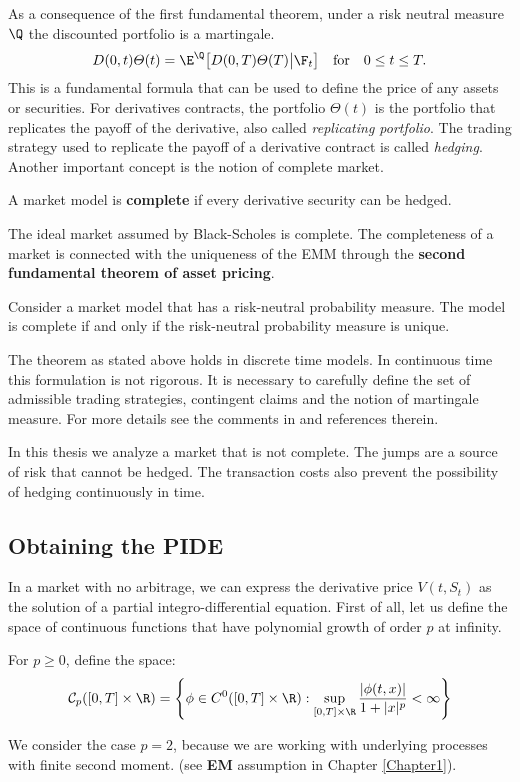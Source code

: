 As a consequence of the first fundamental theorem, under a risk neutral measure $\Q$ the discounted portfolio is a martingale.  
\begin{equation}\label{derivative_price}
 D(0,t) \varTheta(t) = \E^{\Q} \bigl[ D(0,T) \varTheta(T) \big| \F_t \bigr] \quad \mbox{for} \quad 0\leq t \leq T.
\end{equation}
This is a fundamental formula that can be used to define the price of any assets or securities. For derivatives contracts, the portfolio $\varTheta(t)$ is the portfolio that
replicates the payoff of the derivative, also called \emph{replicating portfolio}. The trading strategy used to replicate the payoff of a derivative contract is called \emph{hedging}. 
Another important concept is the notion of complete market.
\begin{Definition}
 A market model is \textbf{complete} if every derivative security can be hedged. 
\end{Definition}
The ideal market assumed by Black-Scholes is complete. The completeness of a market is connected with the uniqueness of the EMM through the
\textbf{second fundamental theorem of asset pricing}.
\begin{Theorem}
 Consider a market model that has a risk-neutral probability measure. The model is complete if and only if the risk-neutral probability measure is unique.
\end{Theorem}
The theorem as stated above holds in discrete time models. In continuous time this formulation is not rigorous. 
It is necessary to carefully define the set of admissible trading strategies, contingent claims and the
notion of martingale measure. For more details see the comments in \cite{Cont} and references therein.

In this thesis we analyze a market that is not complete. The jumps are a source of risk that cannot be hedged. The transaction costs also prevent the possibility of hedging 
continuously in time.


\subsection{Obtaining the PIDE}

In a market with no arbitrage, we can express the derivative price $V(t,S_t)$ as the solution of a partial integro-differential equation.
First of all, let us define the space of continuous functions that have polynomial growth of order $p$ at infinity.
\begin{Definition}\label{Cp}
 For $p\geq 0$, define the space:
\begin{equation}
 \mathcal{C}_p([0,T] \times \R) = \left\{  \phi \in C^0([0,T] \times \R) : \sup_{[0,T] \times \R} 
 \frac{|\phi(t,x)|}{1+|x|^p} <\infty   \right\} 
\end{equation}
\end{Definition}
We consider the case $p=2$, because we are working with underlying processes with finite second moment. (see \textbf{EM} assumption in Chapter \ref{Chapter1}).

